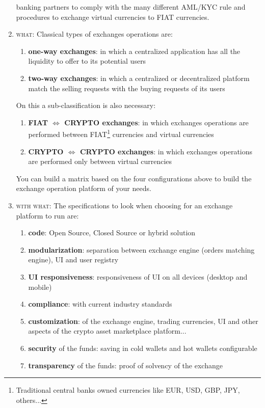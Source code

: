 \documentclass[11pt,fleqn,oneside]{book} %
\begin{document}
\begin{enumerate}
	banking partners to comply with the many different AML/KYC rule and procedures to exchange virtual currencies
	to FIAT currencies.
	\item \textsc{what}: Classical types of exchanges operations are: 
		\begin{enumerate}[label*=\arabic*.]
			\item \textbf{one-way exchanges}: in which a centralized application has all the liquidity to offer to its potential users
			\item \textbf{two-way exchanges}: in which a centralized or decentralized platform match the selling requests with the buying requests
			of its users
		\end{enumerate}
		On this a sub-classification is also necessary:
		\begin{enumerate}[label*=\arabic*.]
			\item \textbf{FIAT $\Leftrightarrow$ CRYPTO exchanges}: in which exchanges operations are performed between FIAT\footnote{Traditional central banks owned currencies like EUR, USD, GBP, JPY, others...} 
			currencies and virtual currencies
			\item \textbf{CRYPTO $\Leftrightarrow$ CRYPTO exchanges}: in which exchanges operations are performed only between virtual currencies
		\end{enumerate}
	You can build a matrix based on the four configurations above to build the exchange operation platform of your needs.
	\item \textsc{with what}: The specifications to look when choosing for an exchange platform to run are:
		\begin{enumerate}[label*=\arabic*.]
			\item \textbf{code}: Open Source, Closed Source or hybrid solution
			\item \textbf{modularization}: separation between exchange engine (orders matching engine), UI and user registry
			\item \textbf{UI responsiveness}: responsiveness of UI on all devices (desktop and mobile)
			\item \textbf{compliance}: with current industry standards
			\item \textbf{customization}: of the exchange engine, trading currencies, UI and other aspects of the crypto asset marketplace platform...
			\item \textbf{security} of the funds: saving in cold wallets and hot wallets configurable
			\item \textbf{transparency} of the funds: proof of solvency of the exchange

\end{enumerate}
\end{enumerate}
\end{document}
